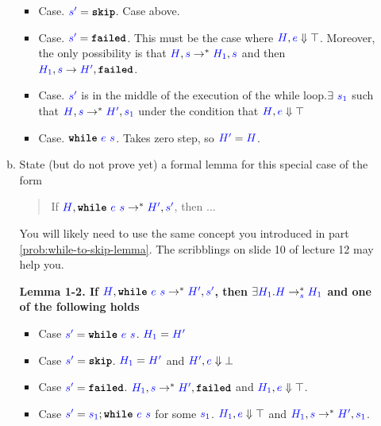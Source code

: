 \documentclass{article}
\theoremstyle{definition}
\newcommand{\meta}[1]{{\color{blue}#1}}
\newcommand{\progtext}[1]{\ensuremath{\text{\ttfamily\bfseries #1}}}
\newcommand{\impskip}{\progtext{skip}}
\newcommand{\failed}{\progtext{failed}}
\newcommand{\while}{\progtext{while}}
\begin{document}
\begin{enumerate}[start=1,label={{\bf Problem \arabic*}.},ref=\arabic*,left=0pt..0pt,widest*=10,align=left,itemindent=*]
\begin{enumerate}[(a),left=1em]
    \begin{itemize}
      \item Case. $\meta{s^\prime}=\impskip$. Case above.
      \item Case. $\meta{s^\prime}=\failed$. This must be the case where $\meta{H}, \meta{e} \Downarrow \top$. Moreover, the only possibility is that $\meta{H}, \meta{s} \to^* \meta{H_1}, \meta{s}$ and then $\meta{H_1}, \meta{s} \to \meta{H^\prime}, \failed$.
      \item Case. $\meta{s^\prime}$ is in the middle of the execution of the while loop.$\exists\ \meta{s_1}$ such that $\meta{H}, \meta{s} \to^* \meta{H^\prime}, \meta{s_1}$ under the condition that $\meta{H}, \meta{e} \Downarrow \top$
      \item Case. $\while\ \meta{e}\ \meta{s}$. Takes zero step, so $\meta{H^\prime}=\meta{H}$. 
    \end{itemize}

  \item State (but do not prove yet) a formal lemma for this special case of the form
    \begin{quote}
      If $\meta{H}, \while\ \meta{e}\ \meta{s} \to^* \meta{H'},\meta{s'}$, then ...
    \end{quote}
    You will likely need to use the same concept you introduced in part \ref{prob:while-to-skip-lemma}.
    The scribblings on slide 10 of lecture 12 may help you.

    \textbf{Lemma 1-2. If $\meta{H}, \while\ \meta{e}\ \meta{s} \to^* \meta{H'},\meta{s'}$, then $\exists \meta{H_1}. \meta{H}\to_{\meta{s}}^* \meta{H_1}$ and one of the following holds}
    \begin{itemize}
      \item Case $\meta{s^\prime}=\while\ \meta{e}\ \meta{s}$. $\meta{H_1}=\meta{H^\prime}$
      \item Case $\meta{s^\prime}=\impskip$. $\meta{H_1}=\meta{H^\prime}$ and $\meta{H^\prime}, \meta{e}\Downarrow \bot$
      \item Case $\meta{s^\prime}=\failed$. $\meta{H_1}, \meta{s} \to^* \meta{H^\prime}, \failed$ and $\meta{H_1}, \meta{e} \Downarrow \top$.
      \item Case $\meta{s^\prime}=\meta{s_1}; \while\ \meta{e}\ \meta{s}$ for some $\meta{s_1}$. $\meta{H_1}, \meta{e} \Downarrow \top$ and $\meta{H_1}, \meta{s} \to^* \meta{H^\prime}, \meta{s_1}$.
    \end{itemize}


\end{enumerate}
\end{enumerate}
\end{document}
